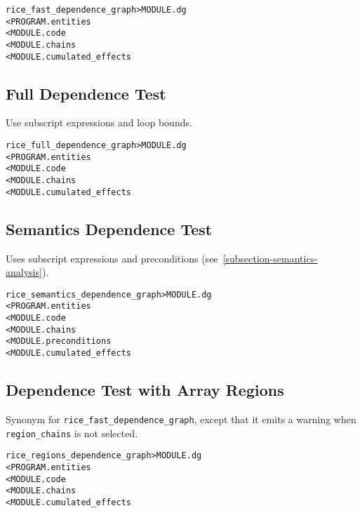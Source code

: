\documentclass[a4paper]{report}
\newenvironment{PipsMake}{\begin{alltt}}{\end{alltt}}
\begin{document}
\begin{PipsMake}
rice_fast_dependence_graph      > MODULE.dg
        < PROGRAM.entities
        < MODULE.code
        < MODULE.chains
        < MODULE.cumulated_effects
\end{PipsMake}

\subsection{Full Dependence Test}
\label{subsubsection-full-dependence-test}

Use subscript expressions and loop bounds.

\begin{PipsMake}
rice_full_dependence_graph      > MODULE.dg
        < PROGRAM.entities
        < MODULE.code
        < MODULE.chains
        < MODULE.cumulated_effects
\end{PipsMake}


\subsection{Semantics Dependence Test}
\label{subsubsection-semantics-dependence-test}

Uses subscript expressions and preconditions
(see~\ref{subsection-semantics-analysis}).

\begin{PipsMake}
rice_semantics_dependence_graph > MODULE.dg
        < PROGRAM.entities
        < MODULE.code
        < MODULE.chains
        < MODULE.preconditions
        < MODULE.cumulated_effects
\end{PipsMake}


\subsection{Dependence Test with Array Regions}
\label{subsubsection-regions-dependence-test}

Synonym for {\tt rice\_fast\_dependence\_graph}, except that it emits a
warning when {\tt region\_chains} is not selected.

\begin{PipsMake}
rice_regions_dependence_graph      > MODULE.dg
        < PROGRAM.entities
        < MODULE.code
        < MODULE.chains
        < MODULE.cumulated_effects
\end{PipsMake}
\end{document}
